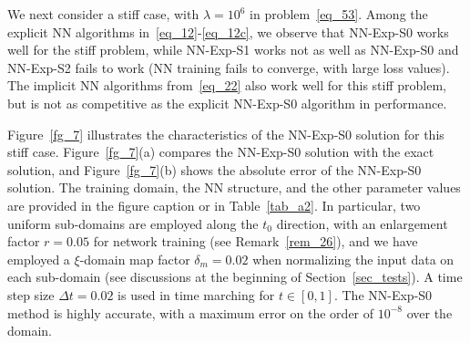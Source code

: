 We next consider a stiff case, with $\lambda=10^6$ in problem~\eqref{eq_53}.
Among the explicit NN algorithms in~\eqref{eq_12}-\eqref{eq_12c}, we observe that
NN-Exp-S0 works well for the
stiff problem, while NN-Exp-S1
works not as well as NN-Exp-S0 and NN-Exp-S2 fails to work (NN training fails
to converge, with large loss values).
The implicit NN algorithms from~\eqref{eq_22}
also work well for this stiff problem, but is not as competitive
as the explicit NN-Exp-S0 algorithm in performance.

Figure~\ref{fg_7} illustrates the characteristics of
the NN-Exp-S0 solution for this stiff case. 
Figure~\ref{fg_7}(a) compares the NN-Exp-S0 solution with
the exact solution, and Figure~\ref{fg_7}(b) shows the absolute error
of the NN-Exp-S0 solution.
The training domain, the NN structure, and the other parameter values are provided
in the figure caption or in Table~\ref{tab_a2}. In particular, two uniform sub-domains are
employed along the $t_0$ direction, with an enlargement factor $r=0.05$
for network training (see Remark~\ref{rem_26}), and
we have employed a $\xi$-domain map factor $\delta_m=0.02$
when normalizing the input data on each sub-domain
(see discussions at the beginning of Section~\ref{sec_tests}).
A time step size $\Delta t=0.02$ is used in time marching for
$t\in[0,1]$. The NN-Exp-S0 method is highly accurate,
with a maximum error on the order of $10^{-8}$ over the domain.



